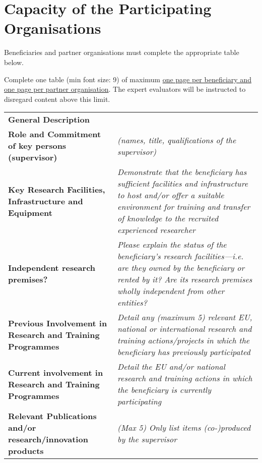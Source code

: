 \newpage
\section{Capacity of the Participating Organisations}
\label{sec:capacities}

Beneficiaries and partner organisations must complete the appropriate table below.

\medskip\noindent
Complete one table (min font size: 9) of maximum \ul{one page per beneficiary and one page per partner organisation}. 
The expert evaluators will be instructed to disregard content above this limit.
\vspace{\baselineskip}


\begin{table}[h!]
{\fontsize{9bp}{1em}\selectfont %
\noindent\begin{tabular}{|>{\raggedright}p{}|p{}|}\hline
  \multicolumn{2}{|l|}{\cellcolor{gray!50}\textbf{Beneficiary X}} \\\hline
\textbf{General Description} &

\\\hline
\textbf{Role and Commitment of key persons (supervisor)} &
{\em (names, title, qualifications of the supervisor)}
{\em }
\\\hline
\textbf{Key Research Facilities, Infrastructure and Equipment} &
{\em Demonstrate that the beneficiary has sufficient facilities and infrastructure to host and/or offer a suitable environment for training and transfer of knowledge to the recruited experienced researcher}
\\\hline
\textbf{Independent research premises?} &
{\em Please explain the status of the beneficiary's research facilities\----i.e. are they owned by the beneficiary or rented by it? Are its research premises wholly independent from other entities?}
\\\hline
\textbf{Previous Involvement in Research and Training Programmes} &
{\em Detail any (maximum 5) relevant EU, national or international research and training actions/projects in which the beneficiary has previously participated}
\\\hline
\textbf{Current involvement in Research and Training Programmes} &
{\em Detail the EU and/or national research and training actions in which the beneficiary is currently participating}
\\\hline
\textbf{Relevant Publications and/or research/innovation products} &
{\em (Max 5) Only list items (co-)produced by the supervisor}
\\\hline
\end{tabular}}
\end{table}

